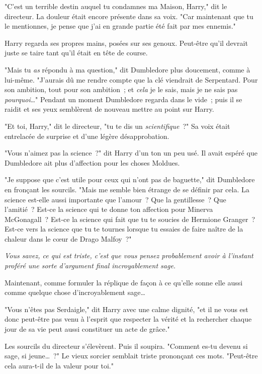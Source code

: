 "C'est un terrible destin auquel tu condamnes ma Maison, Harry," dit le directeur. La douleur était encore présente dans sa voix. "Car maintenant que tu le mentionnes, je pense que j'ai en grande partie été fait par mes ennemis."

Harry regarda ses propres mains, posées sur ses genoux. Peut-être qu'il devrait juste se taire tant qu'il était en tête de course.

"Mais tu \emph{as} répondu à ma question," dit Dumbledore plus doucement, comme à lui-même. "J'aurais dû me rendre compte que la clé viendrait de Serpentard. Pour son ambition, tout pour son ambition~; et \emph{cela} je le sais, mais je ne sais pas \emph{pourquoi}…" Pendant un moment Dumbledore regarda dans le vide~; puis il se raidit et ses yeux semblèrent de nouveau mettre au point sur Harry.

"Et toi, Harry," dit le directeur, "tu te dis un \emph{scientifique}~?" Sa voix était entrelacée de surprise et d'une légère désapprobation.

"Vous n'aimez pas la science~?" dit Harry d'un ton un peu usé. Il avait espéré que Dumbledore ait plus d'affection pour les choses Moldues.

"Je suppose que c'est utile pour ceux qui n'ont pas de baguette," dit Dumbledore en fronçant les sourcils. "Mais me semble bien étrange de se définir par cela. La science est-elle aussi importante que l'amour~? Que la gentillesse~? Que l'amitié~? Est-ce la science qui te donne ton affection pour Minerva McGonagall~? Est-ce la science qui fait que tu te soucies de Hermione Granger~? Est-ce vers la science que tu te tournes lorsque tu essaies de faire naître de la chaleur dans le cœur de Drago Malfoy~?"

\emph{Vous savez, ce qui est triste, c'est que vous pensez probablement avoir à l'instant proféré une sorte d'argument final incroyablement sage.}

Maintenant, comme formuler la réplique de façon à ce qu'elle sonne elle aussi comme quelque chose d'incroyablement sage…

"Vous n'êtes pas Serdaigle," dit Harry avec une calme dignité, "et il ne vous est donc peut-être pas venu à l'esprit que respecter la vérité et la rechercher chaque jour de sa vie peut aussi constituer un acte de grâce."

Les sourcils du directeur s'élevèrent. Puis il soupira. "Comment es-tu devenu si sage, si jeune…~?" Le vieux sorcier semblait triste prononçant ces mots. "Peut-être cela aura-t-il de la valeur pour toi."

